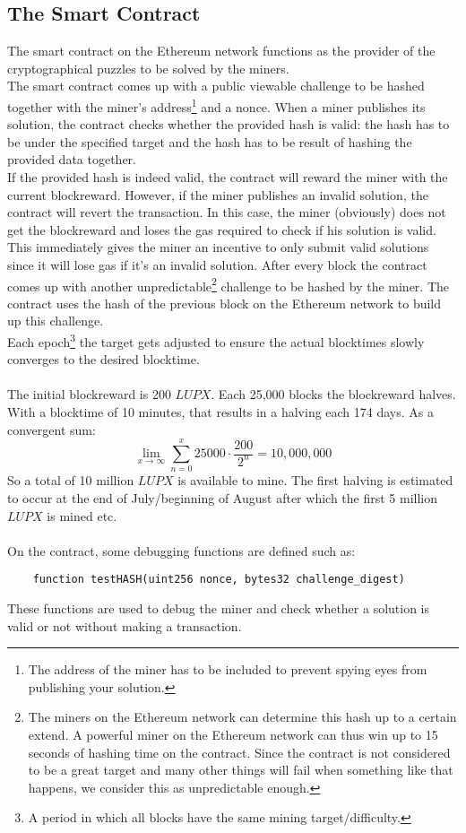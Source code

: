 \documentclass{article}
\begin{document}
\subsection{The Smart Contract}
The smart contract on the Ethereum network functions as the provider of the cryptographical puzzles to be solved by the miners. \\
The smart contract comes up with a public viewable challenge to be hashed together with the miner's address\footnote{The address of the miner has to be included to prevent spying eyes from publishing your solution.} and a nonce. When a miner publishes its solution, the contract checks whether the provided hash is valid: the hash has to be under the specified target and the hash has to be result of hashing the provided data together. \\
If the provided hash is indeed valid, the contract will reward the miner with the current blockreward. However, if the miner publishes an invalid solution, the contract will revert the transaction. In this case, the miner (obviously) does not get the blockreward and loses the gas required to check if his solution is valid. This immediately gives the miner an incentive to only submit valid solutions since it will lose gas if it's an invalid solution. After every block the contract comes up with another unpredictable\footnote{The miners on the Ethereum network can determine this hash up to a certain extend. A powerful miner on the Ethereum network can thus win up to 15 seconds of hashing time on the contract. Since the contract is not considered to be a great target and many other things will fail when something like that happens, we consider this as unpredictable enough.} challenge to be hashed by the miner. The contract uses the hash of the previous block on the Ethereum network to build up this challenge. \\
Each epoch\footnote{A period in which all blocks have the same mining target/difficulty.} the target gets adjusted to ensure the actual blocktimes slowly converges to the desired blocktime. \\
\\
The initial blockreward is 200 $LUPX$. Each 25,000 blocks the blockreward halves. With a blocktime of 10 minutes, that results in a halving each 174 days. As a convergent sum: $$\lim_{x\to\infty} \sum_{n=0}^{x} 25000 \cdot \frac{200}{2^n} = 10,000,000$$ So a total of 10 million $LUPX$ is available to mine. The first halving is estimated to occur at the end of July/beginning of August after which the first 5 million $LUPX$ is mined etc. \\ \\
On the contract, some debugging functions are defined such as: \begin{verbatim}
    function testHASH(uint256 nonce, bytes32 challenge_digest)
\end{verbatim}  
These functions are used to debug the miner and check whether a solution is valid or not without making a transaction.
\end{document}
